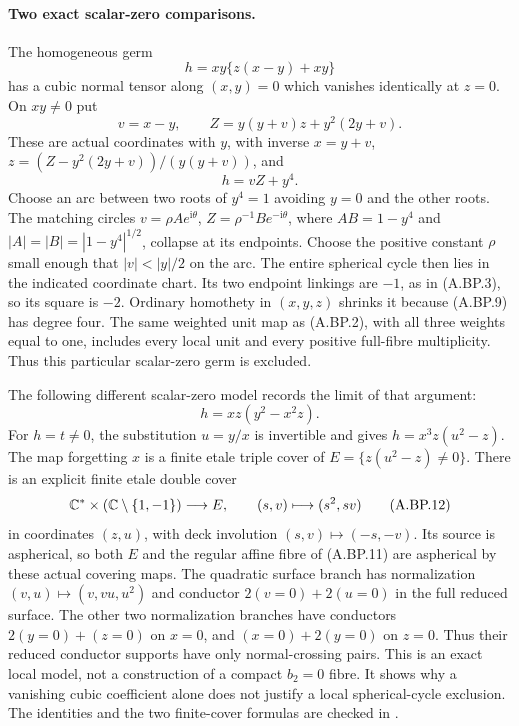 \paragraph{Two exact scalar-zero comparisons.}
The homogeneous germ
\[
                  h=xy\{z(x-y)+xy\}
\tag{A.BP.9}
\]
has a cubic normal tensor along $(x,y)=0$ which
vanishes identically at $z=0$. On $xy\ne0$ put
\[
 v=x-y,\qquad Z=y(y+v)z+y^2(2y+v).
\]
These are actual coordinates with $y$, with inverse
$x=y+v$, $z=(Z-y^2(2y+v))/(y(y+v))$, and
\[
                              h=vZ+y^4.
\tag{A.BP.10}
\]
Choose an arc between two roots of $y^4=1$ avoiding
$y=0$ and the other roots. The matching circles
$v=\rho A e^{\mathrm i\theta}$,
$Z=\rho^{-1}B e^{-\mathrm i\theta}$, where
$AB=1-y^4$ and $|A|=|B|=|1-y^4|^{1/2}$,
collapse at its endpoints. Choose the positive
constant $\rho$ small enough that $|v|<|y|/2$
on the arc. The entire spherical cycle then lies
in the indicated coordinate chart. Its two endpoint
linkings are $-1$, as in (A.BP.3), so its square
is $-2$. Ordinary homothety in $(x,y,z)$ shrinks
it because (A.BP.9) has degree four. The same
weighted unit map as (A.BP.2), with all three
weights equal to one, includes every local unit
and every positive full-fibre multiplicity.
Thus this particular scalar-zero germ is excluded.

The following different scalar-zero model records
the limit of that argument:
\[
                     h=xz(y^2-x^2z).
\tag{A.BP.11}
\]
For $h=t\ne0$, the substitution $u=y/x$ is
invertible and gives $h=x^3 z(u^2-z)$.
The map forgetting $x$ is a finite etale triple
cover of $E=\{z(u^2-z)\ne0\}$.
There is an explicit finite etale double cover
\[
 \mathbb C^*\times(\mathbb C\setminus\{1,-1\})\longrightarrow E,
                  \qquad(s,v)\longmapsto(s^2,sv)
\tag{A.BP.12}
\]
in coordinates $(z,u)$, with deck involution
$(s,v)\mapsto(-s,-v)$. Its source is aspherical,
so both $E$ and the regular affine fibre of
(A.BP.11) are aspherical by these actual covering
maps. The quadratic surface branch has normalization
$(v,u)\mapsto(v,vu,u^2)$ and conductor
$2(v=0)+2(u=0)$ in the full reduced surface.
The other two normalization branches have conductors
$2(y=0)+(z=0)$ on $x=0$, and
$(x=0)+2(y=0)$ on $z=0$.
Thus their reduced conductor supports have only
normal-crossing pairs. This is an exact local
model, not a construction of a compact $b_2=0$
fibre. It shows why a vanishing cubic coefficient
alone does not justify a local spherical-cycle
exclusion. The identities and the two finite-cover
formulas are checked in .

